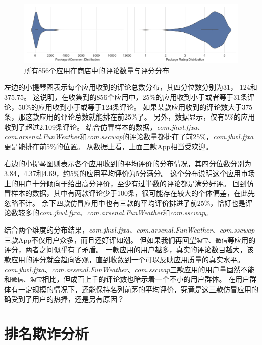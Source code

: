 \begin{figure}[htbp]
	\centering
	\includegraphics[width=\textwidth]{./Figures/edwin-360-comment-dist.png}
    \caption{所有856个应用在商店中的评论数量与评分分布}
    \label{fig:cmt_dist_total}
\end{figure}

左边的小提琴图表示每个应用收到的评论总数分布，其四分位数分别为31， 124和375.75。
这说明，在收集到的856个应用中，25\%的应用收到小于或者等于31条评论，50\%的应用收到小于或等于124条评论。
如果某款应用收到的评论数大于375条，那这款应用的评论总数就能排在前25\%了。
另外，数据显示，仅有5\%的应用收到了超过2,109条评论。
结合仿冒样本的数据，\emph{com.jhwl.fjxa}、\emph{com.arsenal.FunWeather}和\emph{com.sscwap}的评论数量都排在了前25\%，\emph{com.jhwl.fjxa}更是能排在前5\%的位置。
从数据上看，上面三款App相当受欢迎。

右边的小提琴图则表示各个应用收到的平均评价的分布情况，其四分位数分别为3.84，4.37和4.69，约5\%的应用平均评价为5分满分。
这个分布说明这个应用市场上的用户十分倾向于给出高分评价，至少有过半数的评论都是满分好评。
回到仿冒样本的数据，其中有两款评论少于100条，很可能存在较大的个体偏差，在此先忽略不计。
余下四款仿冒应用中也有三款的平均评价排进了前25\%，恰好也是评论数较多的\emph{com.jhwl.fjxa}、\emph{com.arsenal.FunWeather}和\emph{com.sscwap}。

结合两个维度的分布结果，\emph{com.jhwl.fjxa}、\emph{com.arsenal.FunWeather}、\emph{com.sscwap}三款App不仅用户众多，而且还好评如潮。
但如果我们再回望\texttt{淘宝}、\texttt{微信}等应用的评分，两者之间似乎有了矛盾。
一款应用的用户越多，真实的评论数目越大，该款应用的评分就会趋向客观，直到收敛到一个可以反映应用质量的真实水平。
\emph{com.jhwl.fjxa}、\emph{com.arsenal.FunWeather}、\emph{com.sscwap}三款应用的用户量固然不能和\texttt{微信}、\texttt{淘宝}相比，但成百上千的评论数也暗示着一个不小的用户群体。
在用户群体有一定规模的情况下，还能保持名列前茅的平均评价，究竟是这三款仿冒应用的确受到了用户的热捧，还是另有原因？

\section{排名欺诈分析}

